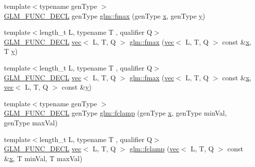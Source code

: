 \begin{DoxyCompactItemize}
\item 
{\footnotesize template$<$typename gen\+Type $>$ }\\\mbox{\hyperlink{setup_8hpp_ab2d052de21a70539923e9bcbf6e83a51}{G\+L\+M\+\_\+\+F\+U\+N\+C\+\_\+\+D\+E\+CL}} gen\+Type \mbox{\hyperlink{group__gtx__extended__min__max_gae5792cb2b51190057e4aea027eb56f81}{glm\+::fmax}} (gen\+Type \mbox{\hyperlink{_s_d_l__opengl_8h_ad0e63d0edcdbd3d79554076bf309fd47}{x}}, gen\+Type \mbox{\hyperlink{_s_d_l__opengl_8h_a1675d9d7bb68e1657ff028643b4037e3}{y}})
\item 
{\footnotesize template$<$length\+\_\+t L, typename T , qualifier Q$>$ }\\\mbox{\hyperlink{setup_8hpp_ab2d052de21a70539923e9bcbf6e83a51}{G\+L\+M\+\_\+\+F\+U\+N\+C\+\_\+\+D\+E\+CL}} \mbox{\hyperlink{structglm_1_1vec}{vec}}$<$ L, T, Q $>$ \mbox{\hyperlink{group__gtx__extended__min__max_gab380df808a15a6a23993e3475d1b94d2}{glm\+::fmax}} (\mbox{\hyperlink{structglm_1_1vec}{vec}}$<$ L, T, Q $>$ const \&\mbox{\hyperlink{_s_d_l__opengl_8h_ad0e63d0edcdbd3d79554076bf309fd47}{x}}, T \mbox{\hyperlink{_s_d_l__opengl_8h_a1675d9d7bb68e1657ff028643b4037e3}{y}})
\item 
{\footnotesize template$<$length\+\_\+t L, typename T , qualifier Q$>$ }\\\mbox{\hyperlink{setup_8hpp_ab2d052de21a70539923e9bcbf6e83a51}{G\+L\+M\+\_\+\+F\+U\+N\+C\+\_\+\+D\+E\+CL}} \mbox{\hyperlink{structglm_1_1vec}{vec}}$<$ L, T, Q $>$ \mbox{\hyperlink{group__gtx__extended__min__max_ga538c9e7de1d0cb8157e548691487d32a}{glm\+::fmax}} (\mbox{\hyperlink{structglm_1_1vec}{vec}}$<$ L, T, Q $>$ const \&\mbox{\hyperlink{_s_d_l__opengl_8h_ad0e63d0edcdbd3d79554076bf309fd47}{x}}, \mbox{\hyperlink{structglm_1_1vec}{vec}}$<$ L, T, Q $>$ const \&\mbox{\hyperlink{_s_d_l__opengl_8h_a1675d9d7bb68e1657ff028643b4037e3}{y}})
\item 
{\footnotesize template$<$typename gen\+Type $>$ }\\\mbox{\hyperlink{setup_8hpp_ab2d052de21a70539923e9bcbf6e83a51}{G\+L\+M\+\_\+\+F\+U\+N\+C\+\_\+\+D\+E\+CL}} gen\+Type \mbox{\hyperlink{group__gtx__extended__min__max_ga1e28539d3a46965ed9ef92ec7cb3b18a}{glm\+::fclamp}} (gen\+Type \mbox{\hyperlink{_s_d_l__opengl_8h_ad0e63d0edcdbd3d79554076bf309fd47}{x}}, gen\+Type min\+Val, gen\+Type max\+Val)
\item 
{\footnotesize template$<$length\+\_\+t L, typename T , qualifier Q$>$ }\\\mbox{\hyperlink{setup_8hpp_ab2d052de21a70539923e9bcbf6e83a51}{G\+L\+M\+\_\+\+F\+U\+N\+C\+\_\+\+D\+E\+CL}} \mbox{\hyperlink{structglm_1_1vec}{vec}}$<$ L, T, Q $>$ \mbox{\hyperlink{group__gtx__extended__min__max_ga60796d08903489ee185373593bc16b9d}{glm\+::fclamp}} (\mbox{\hyperlink{structglm_1_1vec}{vec}}$<$ L, T, Q $>$ const \&\mbox{\hyperlink{_s_d_l__opengl_8h_ad0e63d0edcdbd3d79554076bf309fd47}{x}}, T min\+Val, T max\+Val)

\end{DoxyCompactItemize}

